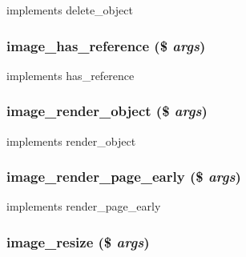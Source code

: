 implements delete\_\-object \hypertarget{module__image_8inc_8php_0bef6164f5eafe368d251639cf6fe298}{
\subsubsection[{image\_\-has\_\-reference}]{\setlength{\rightskip}{0pt plus 5cm}image\_\-has\_\-reference (\$ {\em args})}}
\label{module__image_8inc_8php_0bef6164f5eafe368d251639cf6fe298}


implements has\_\-reference \hypertarget{module__image_8inc_8php_4fadded2a225d1b5ea73404a84597620}{
\subsubsection[{image\_\-render\_\-object}]{\setlength{\rightskip}{0pt plus 5cm}image\_\-render\_\-object (\$ {\em args})}}
\label{module__image_8inc_8php_4fadded2a225d1b5ea73404a84597620}


implements render\_\-object \hypertarget{module__image_8inc_8php_8266a74a11a86a73e2aa3709388fd43f}{
\subsubsection[{image\_\-render\_\-page\_\-early}]{\setlength{\rightskip}{0pt plus 5cm}image\_\-render\_\-page\_\-early (\$ {\em args})}}
\label{module__image_8inc_8php_8266a74a11a86a73e2aa3709388fd43f}


implements render\_\-page\_\-early \hypertarget{module__image_8inc_8php_9e03a71310133176236ae0bd4a0241e0}{
\subsubsection[{image\_\-resize}]{\setlength{\rightskip}{0pt plus 5cm}image\_\-resize (\$ {\em args})}}
\label{module__image_8inc_8php_9e03a71310133176236ae0bd4a0241e0}



